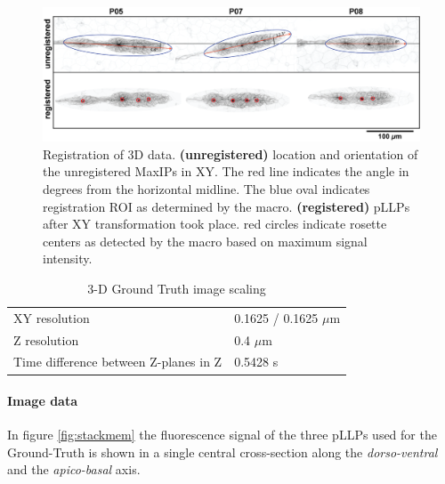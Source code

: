 \documentclass[11pt,singlespacinge,twoside]{reedthesis} %
\theoremstyle{definition}
\theoremstyle{definition}
\theoremstyle{definition}
\theoremstyle{remark}
\begin{document}
\begin{figure}

{\centering \includegraphics[width=0.95\linewidth]{figures/materials/ground_truth/registration} 

}

\caption[Registration of 3D data]{Registration of 3D data. \textbf{(unregistered)} location and orientation of the unregistered MaxIPs in XY. The red line indicates the angle in degrees from the horizontal midline. The blue oval indicates registration ROI as determined by the macro. \textbf{(registered)} pLLPs after XY transformation took place. red circles indicate rosette centers as detected by the macro based on maximum signal intensity.}\label{fig:maxraw}
\end{figure}
\begin{table}[!h]

\caption{\label{tab:imgprop}3-D Ground Truth image scaling}
\centering
\begin{tabu} to 
\toprule
{}  XY resolution & 0.1625 / 0.1625 $\mu$m\\
Z resolution & 0.4 $\mu$m\\
  Time difference between Z-planes in Z & 0.5428 s\\
\bottomrule
\end{tabu}
\end{table}
\hypertarget{image-data}{%
\paragraph{Image data}\label{image-data}}

In figure \ref{fig:stackmem} the fluorescence signal of the three pLLPs used for the Ground-Truth is shown in a single central cross-section along the \emph{dorso-ventral} and the \emph{apico-basal} axis.
\end{document}
